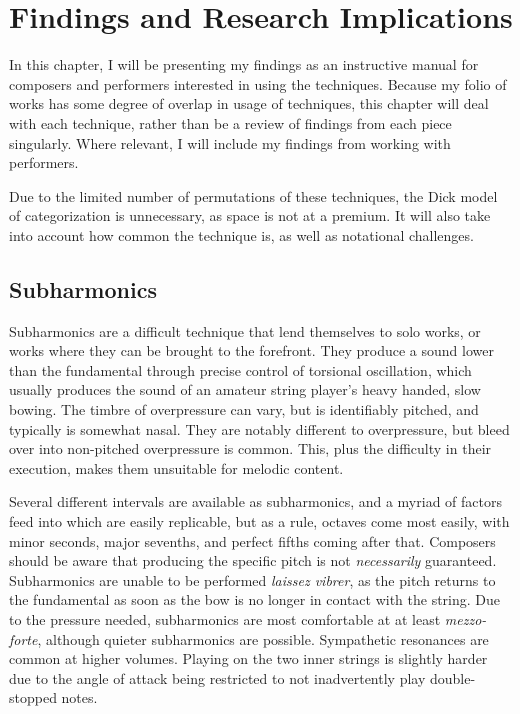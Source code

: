 
\chapter{Findings and Research Implications}
In this chapter, I will be presenting my findings as an instructive manual for composers and performers interested in using the techniques.
Because my folio of works has some degree of overlap in usage of techniques, this chapter will deal with each technique, rather than be a review of findings from each piece singularly.
Where relevant, I will include my findings from working with performers.

Due to the limited number of permutations of these techniques, the Dick model of categorization is unnecessary, as space is not at a premium.\autocite{dickOtherFlute1989} 
It will also take into account how common the technique is, as well as notational challenges.

\section{Subharmonics} \label{sec:subharmonics}
Subharmonics are a difficult technique that lend themselves to solo works, or works where they can be brought to the forefront.
They produce a sound lower than the fundamental through precise control of torsional oscillation, which usually produces the sound of an amateur string player's heavy handed, slow bowing. 
The timbre of overpressure can vary, but is identifiably pitched, and typically is somewhat nasal.
They are notably different to overpressure, but bleed over into non-pitched overpressure is common.
This, plus the difficulty in their execution, makes them unsuitable for melodic content.

Several different intervals are available as subharmonics, and a myriad of factors feed into which are easily replicable, but as a rule, octaves come most easily, with minor seconds, major sevenths, and perfect fifths coming after that.
Composers should be aware that producing the specific pitch is not \emph{necessarily} guaranteed.
Subharmonics are unable to be performed \emph{laissez vibrer}, as the pitch returns to the fundamental as soon as the bow is no longer in contact with the string.\autocite[]{appleseedFeedbackExploratorySession2019}
Due to the pressure needed, subharmonics are most comfortable at at least \emph{mezzo-forte}, although quieter subharmonics are possible. 
Sympathetic resonances are common at higher volumes.
Playing on the two inner strings is slightly harder due to the angle of attack being restricted to not inadvertently play double-stopped notes.



